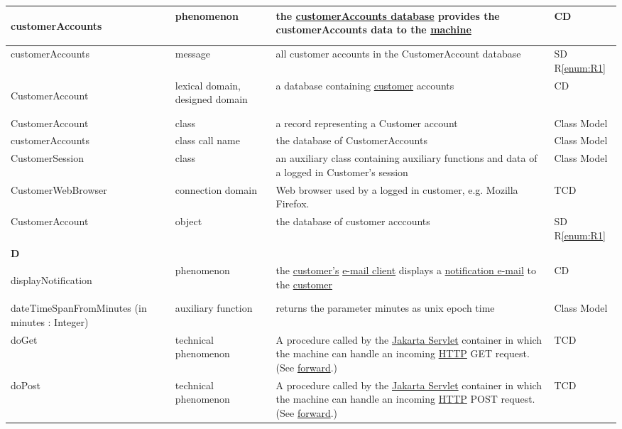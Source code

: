\documentclass[a4paper,10pt,titlepage,bibtotoc,bibtotocnumbered]{scrreprt}
\begin{document}
\begin{longtable}{|p{.4\linewidth}|p{.2\linewidth}|p{.2\linewidth}|p{.2\linewidth}|}
\hline
\hypertarget{glossary:customerAccounts}{customerAccounts} & phenomenon & the \hyperlink{glossary:CustomerAccount}{customerAccounts database} provides the customerAccounts data to the \hyperlink{glossary:UDEKino}{machine} & CD\\
\hline
customerAccounts & message & all customer accounts in the CustomerAccount database & SD R\ref{enum:R1}\\
\hline
\hypertarget{glossary:CustomerAccount}{CustomerAccount} & lexical domain, designed domain & a database containing \hyperlink{glossary:Customer}{customer} accounts & CD\\
\hline
CustomerAccount & class & a record representing a Customer account & Class Model\\
\hline
customerAccounts & class call name & the database of CustomerAccounts & Class Model\\
\hline
CustomerSession & class & an auxiliary class containing auxiliary functions and data of a logged in Customer's session & Class Model\\
\hline
CustomerWebBrowser & connection domain & Web browser used by a logged in customer, e.g. Mozilla Firefox. & TCD\\
\hline
CustomerAccount & object & the database of customer acccounts & SD R\ref{enum:R1}\\
\hline
\multicolumn{4}{|l|}{\textbf{D}}\\
\hline
\hypertarget{glossary:displayNotification}{displayNotification} & phenomenon & the \hyperlink{glossary:Customer}{customer's} \hyperlink{glossary:Email}{e-mail client} displays a \hyperlink{glossary:notifyCustomer}{notification e-mail} to the \hyperlink{glossary:Customer}{customer} & CD\\
\hline
dateTimeSpanFromMinutes (in minutes : Integer) & auxiliary function & returns the parameter minutes as unix epoch time & Class Model\\
\hline
doGet & technical phenomenon & A procedure called by the \href{https://jakarta.ee/specifications/servlet/}{Jakarta Servlet} container in which the machine can handle an incoming \href{https://datatracker.ietf.org/doc/html/rfc9112}{HTTP} GET request. (See \hyperlink{glossary:forward}{forward}.) & TCD\\
\hline
doPost & technical phenomenon & A procedure called by the \href{https://jakarta.ee/specifications/servlet/}{Jakarta Servlet} container in which the machine can handle an incoming \href{https://datatracker.ietf.org/doc/html/rfc9112}{HTTP} POST request. (See \hyperlink{glossary:forward}{forward}.) & TCD\\

\end{longtable}
\end{document}
